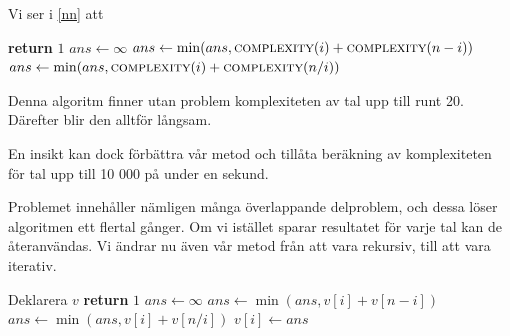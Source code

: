 \documentclass[a4paper,titlepage]{article}
\renewcommand{\O}{\mathcal {O}}
\theoremstyle{definition}
\begin{document}
    Vi ser i \ref{nn} att 

    \begin{algorithm}[H]
        \caption{$\O(N^N)$}
        \label{nn}
        \begin{algorithmic}[1]
                    \State \textbf{return} $1$
                \EndIf
                \State  $ans\gets \infty$
                    \State $ans\gets \min(ans, \textsc{complexity}(i)+\textsc{complexity}(n-i))$
                \EndFor
                        \State $ans\gets \min(ans, \textsc{complexity}(i)+\textsc{complexity}(n/i))$
                    \EndIf
                \EndFor
            \EndProcedure
        \end{algorithmic}
    \end{algorithm}

    Denna algoritm finner utan problem komplexiteten av tal upp till runt 20.
    Därefter blir den alltför långsam.

    En insikt kan dock förbättra vår metod och tillåta beräkning av komplexiteten
    för tal upp till 10 000 på under en sekund.

    Problemet innehåller nämligen många överlappande delproblem, och dessa löser
    algoritmen ett flertal gånger. Om vi istället sparar resultatet för varje tal
    kan de återanvändas. Vi ändrar nu även vår metod från att vara rekursiv, till
    att vara iterativ.


    \begin{algorithm}[H]
        \caption{$\O(N^2)$}
        \begin{algorithmic}[1]
                \State Deklarera $v$
                    \State \textbf{return} $1$
                    \State  $ans\gets \infty$
                        \State $ans\gets \min(ans, v[i]+ v[n-i])$
                    \EndFor
                            \State $ans\gets \min(ans, v[i]+v[n/i])$
                        \EndIf
                    \EndFor
                    \State $v[i] \gets ans$
                \EndFor
            \EndProcedure
        \end{algorithmic}
    \end{algorithm}
\end{document}
